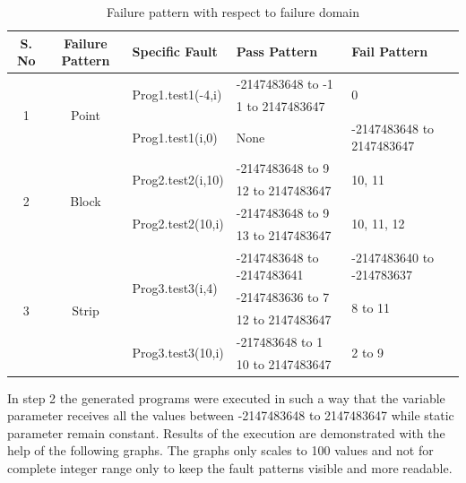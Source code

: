 \documentclass{acm_proc_article-sp}
\begin{document}
\begin{table}[t]
\centering

\begin{tabular}{|c|c|l|l|l|}

\hline 

\textbf{S. No}		& \textbf{Failure Pattern}	& \textbf{Specific Fault}	 		& \textbf{Pass Pattern} 			& \textbf{Fail Pattern} 			\\ \hline 


\multirow{3}{*}{1} 	&\multirow{3}{*}{Point}	&\multirow{2}{*}{Prog1.test1(-4,i)}	&-2147483648 to -1				&\multirow{2}{*}{0}	  			\\ \cline{4-4} 
				&					&							&1 to 2147483647				&	                           			\\ \cline{3-5}
				&					&Prog1.test1(i,0)				&None						&-2147483648 to 2147483647 	\\ \hline
\multirow{4}{*}{2}	&\multirow{4}{*}{Block}	&\multirow{2}{*}{Prog2.test2(i,10)}	&-2147483648 to 9				&\multirow{2}{*}{10, 11}			\\ \cline{4-4} 
				&					&							&12 to 2147483647				&		   		   			\\ \cline{3-5} 
				&					&\multirow{2}{*}{Prog2.test2(10,i)}	&-2147483648 to 9				&\multirow{2}{*}{10, 11, 12}		\\ \cline{4-4} 
				&					&							&13 to 2147483647				&							\\ \hline
\multirow{5}{*}{3} 	&\multirow{5}{*}{Strip}	&\multirow{3}{*}{Prog3.test3(i,4)}	&-2147483648 to -2147483641	&-2147483640 to -214783637 		\\ \cline{4-5} 
				&					&	 						&-2147483636 to 7				&\multirow{2}{*}{8 to 11}			\\ \cline{4-4} 
				&					&	 						&12 to 2147483647				&							\\ \cline{3-5} 
				&					& \multirow{2}{*}{Prog3.test3(10,i)}	&-217483648 to 1				&\multirow{2}{*}{2 to 9}			\\ \cline{4-4}
				&					&	 						&10 to 2147483647				&							\\ \hline
\end{tabular}
\caption{Failure pattern with respect to failure domain}
\label{tb:failtable}
\end{table}


In step 2 the generated programs were executed in such a way that the variable parameter receives all the values between -2147483648 to 2147483647 while static parameter remain constant. Results of the execution are demonstrated with the help of the following graphs. The graphs only scales to 100 values and not for complete integer range only to keep the fault patterns visible and more readable.
\end{document}
